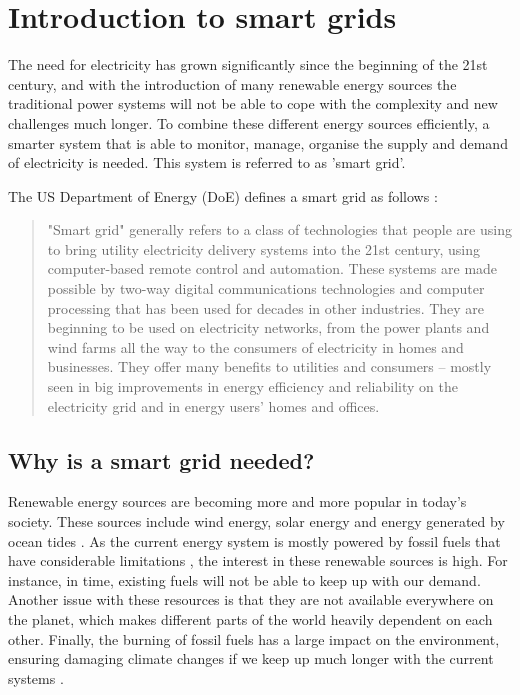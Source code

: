 \section{Introduction to smart grids}
The need for electricity has grown significantly since the beginning of the 21st century, and with the introduction of many renewable energy sources the traditional power systems will not be able to cope with the complexity and new challenges much longer. To combine these different energy sources efficiently, a smarter system that is able to monitor, manage, organise the supply and demand of electricity is needed.  This system is referred to as 'smart grid'. 

The US Department of Energy (DoE) defines a smart grid as follows \cite{doe}: 
\begin{quote}
"Smart grid" generally refers to a class of technologies that people are using to bring utility electricity delivery systems into the 21st century, using computer-based remote control and automation. These systems are made possible by two-way digital communications technologies and computer processing that has been used for decades in other industries. They are beginning to be used on electricity networks, from the power plants and wind farms all the way to the consumers of electricity in homes and businesses. They offer many benefits to utilities and consumers -- mostly seen in big improvements in energy efficiency and reliability on the electricity grid and in energy users' homes and offices.
\end{quote}

\subsection{Why is a smart grid needed?}
Renewable energy sources are becoming more and more popular in today's society. These sources include wind energy, solar energy and energy generated by ocean tides \cite{Tromly2001}. As the current energy system is mostly powered by fossil fuels that have considerable limitations , the interest in these renewable sources is high. For instance, in time, existing fuels will not be able to keep up with our demand.  Another issue with these resources is that they are not available everywhere on the planet, which makes different parts of the world  heavily dependent on each other. Finally, the burning of fossil fuels has a large impact on the environment, ensuring damaging  climate changes if we keep up much longer with the current systems \cite{friedman2008hot}. 

